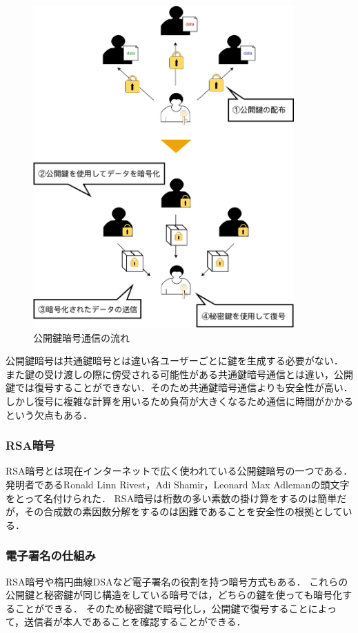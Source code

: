 \documentclass[a4j,12pt]{jsarticle}
\begin{document}
\begin{figure}[H]
\centering
\includegraphics[width=10cm]{kokai.pdf}
\caption{公開鍵暗号通信の流れ}
\label{fig:no}
\end{figure} 

公開鍵暗号は共通鍵暗号とは違い各ユーザーごとに鍵を生成する必要がない．
また鍵の受け渡しの際に傍受される可能性がある共通鍵暗号通信とは違い，公開鍵では復号することができない．そのため共通鍵暗号通信よりも安全性が高い．しかし復号に複雑な計算を用いるため負荷が大きくなるため通信に時間がかかるという欠点もある．



\subsubsection{RSA暗号}
RSA暗号とは現在インターネットで広く使われている公開鍵暗号の一つである．
発明者であるRonald Linn Rivest，Adi Shamir，Leonard Max Adlemanの頭文字をとって名付けられた．
RSA暗号は桁数の多い素数の掛け算をするのは簡単だが，その合成数の素因数分解をするのは困難であることを安全性の根拠としている．


\subsubsection{電子署名の仕組み}

RSA暗号や楕円曲線DSAなど電子署名の役割を持つ暗号方式もある．
これらの公開鍵と秘密鍵が同じ構造をしている暗号では，どちらの鍵を使っても暗号化することができる．
そのため秘密鍵で暗号化し，公開鍵で復号することによって，送信者が本人であることを確認することができる．
\end{document}
